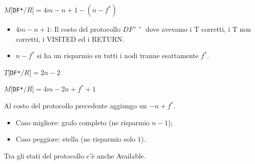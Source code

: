 \begin{center}
    $M[$\texttt{DF*}$/R] = 4m - n + 1 - (n - f^*)$
\end{center}

\begin{itemize}
    \item $ 4m - n + 1$: Il costo del protocollo $DF^{++}$ dove avevamo i T
          corretti, i T non corretti, i VISITED ed i RETURN.
    \item $n-f^*$ si ha un risparmio su tutti i nodi tranne esattamente $f^*$.
\end{itemize}
\begin{center}
    $T[$\texttt{DF*}$/R] = 2n - 2$
\end{center}
\begin{center}
    $M[$\texttt{DF*}$/R] = 4m - 2n + f^* + 1$
\end{center}
Al costo del protocollo precedente aggiungo un $-n+f^*$.
\begin{itemize}
    \item Caso migliore: grafo completo (ne risparmio $n-1$);
    \item Caso peggiore: stella (ne risparmio solo $1$).
\end{itemize}
Tra gli stati del protocollo c'è anche Available.

